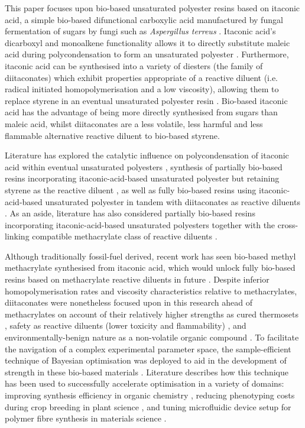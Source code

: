 This paper focuses upon bio-based unsaturated polyester
 resins based on itaconic acid, a simple bio-based
 difunctional carboxylic acid manufactured by fungal
 fermentation of sugars by fungi such as 
 \textit{Aspergillus terreus} \autocite{Bafana2017}.
Itaconic acid's dicarboxyl and monoalkene functionality
 allows it to directly substitute maleic acid during
 polycondensation to form an unsaturated polyester 
 \autocite{Bamane2020}.
Furthermore, itaconic acid can be synthesised into a
 variety of diesters (the family of diitaconates) which
 exhibit properties appropriate
 of a reactive diluent (i.e. radical initiated
 homopolymerisation and a low viscosity), allowing
 them to replace styrene in an eventual unsaturated
 polyester resin \autocite{Sollka2020}.
Bio-based itaconic acid has the advantage of being more
 directly synthesised from sugars than maleic acid, whilst
 diitaconates are a less volatile, less harmful and less
 flammable alternative reactive diluent to bio-based
 styrene.

Literature has explored the catalytic influence on polycondensation
 of itaconic acid within eventual unsaturated polyesters
 \autocite{Schoon2017}, synthesis of partially bio-based resins
 incorporating itaconic-acid-based unsaturated polyester but
 retaining styrene as the reactive diluent \autocite{Costa2017},
 as well as fully bio-based resins using itaconic-acid-based
 unsaturated polyester in tandem with diitaconates as
 reactive diluents \autocite{Pantic2022,Panic2017}.
As an aside, literature has also considered partially bio-based
 resins incorporating itaconic-acid-based unsaturated polyesters
 together with the cross-linking compatible methacrylate class
 of reactive diluents \autocite{Spasojevic2021,Dai2017}.

Although traditionally fossil-fuel derived, recent work has seen
 bio-based methyl methacrylate synthesised from
 itaconic acid, which would unlock fully bio-based resins based
 on methacrylate reactive diluents in future \autocite{Nagai2001,Bohre2021}.
Despite inferior homopolymerisation rates \autocite{Sollka2020} and viscosity
 characteristics \autocite{Spasojevic2021} relative to methacrylates, 
 diitaconates were nonetheless focused upon in this research ahead of 
 methacrylates on account of their relatively higher strengths as cured 
 thermosets \autocite{Spasojevic2021}, safety as reactive diluents 
 (lower toxicity and flammability) \autocite{Leonard1970}, and 
 environmentally-benign nature as a non-volatile organic compound 
 \autocite{Spasojevic2021,Trejbal2022}.
To facilitate the navigation of a complex experimental parameter space,
 the sample-efficient technique of Bayesian optimisation was deployed to
 aid in the development of strength in these bio-based materials
 \autocite{Frazier2018}.
Literature describes how this technique has been used to successfully
 accelerate optimisation in a variety of domains: improving synthesis 
 efficiency in organic chemistry \autocite{Shields2021}, reducing 
 phenotyping costs during crop breeding in plant science
 \autocite{Tanaka2017}, and tuning microfluidic device setup for polymer
 fibre synthesis in materials science \autocite{Li2017}.

